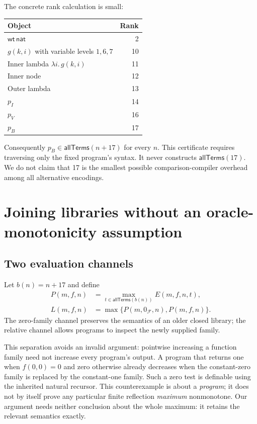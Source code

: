 \documentclass[11pt,letterpaper]{article}
\theoremstyle{definition}
\newcommand{\Fam}{\mathcal F}
\begin{document}
The concrete rank calculation is small:
\begin{center}
\begin{tabular}{@{}lr@{}}
\toprule
Object & Rank\\
\midrule
$\mathsf{wt}\,\mathsf{nat}$ & 2\\
$g(k,i)$ with variable levels $1,6,7$ & 10\\
Inner lambda $\lambda i.\,g(k,i)$ & 11\\
Inner node & 12\\
Outer lambda & 13\\
$p_I$ & 14\\
$p_V$ & 16\\
$p_B$ & 17\\
\bottomrule
\end{tabular}
\end{center}
Consequently $p_B\in\mathsf{allTerms}(n+17)$ for every $n$. This certificate
requires traversing only the fixed program's syntax. It never constructs
$\mathsf{allTerms}(17)$. We do not claim that 17 is the smallest possible
comparison-compiler overhead among all alternative encodings.

\section{Joining libraries without an oracle-monotonicity assumption}
\label{sec:join}

\subsection{Two evaluation channels}

Let $b(n)=n+17$ and define
\begin{align}
 P(m,f,n)&=\max_{t\in\mathsf{allTerms}(b(n))}E(m,f,n,t),\\
 L(m,f,n)&=\max\{P(m,0_{\Fam},n),P(m,f,n)\}.
\label{eq:librarybound}
\end{align}
The zero-family channel preserves the semantics of an older closed library;
the relative channel allows programs to inspect the newly supplied family.

This separation avoids an invalid argument: pointwise increasing a function
family need not increase every program's output. A program that returns one
when $f(0,0)=0$ and zero otherwise already decreases when the constant-zero
family is replaced by the constant-one family. Such a zero test is definable
using the inherited natural recursor. This counterexample is about a
\emph{program}; it does not by itself prove any particular finite reflection
\emph{maximum} nonmonotone. Our argument needs neither conclusion about the
whole maximum: it retains the relevant semantics exactly.
\end{document}
